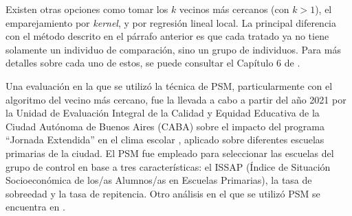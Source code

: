 \documentclass[../../main.tex]{subfiles}
\begin{document}
Existen otras opciones como tomar los \(k\) vecinos más cercanos (con \(k > 1\)), el
emparejamiento por \textit{kernel}, y por regresión lineal local. La principal diferencia
con el método descrito en el párrafo anterior es que cada tratado ya no tiene solamente un
individuo de comparación, sino un grupo de individuos. Para más detalles sobre cada uno de
estos, se puede consultar el Capítulo 6 de \cite{bernal}.


\medskip

Una evaluación en la que se utilizó la técnica de PSM, particularmente con el algoritmo
del vecino más cercano, fue la llevada a cabo a partir del año 2021 por la Unidad de
Evaluación Integral de la Calidad y Equidad Educativa de la Ciudad Autónoma de Buenos
Aires (CABA) sobre el impacto del programa ``Jornada Extendida'' en el clima escolar
\cite{ueicee2023jornada}, aplicado sobre diferentes escuelas primarias de la ciudad. El
PSM fue empleado para seleccionar las escuelas del grupo de control en base a tres
características: el ISSAP (Índice de Situación Socioeconómica de los/as Alumnos/as en
Escuelas Primarias), la tasa de sobreedad y la tasa de repitencia. Otro análisis en el
que se utilizó PSM se encuentra en \cite{psm-case-maternal-healthcare}.
\end{document}
